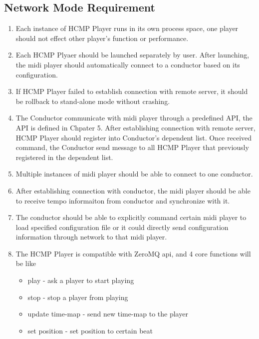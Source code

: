 \subsection{Network Mode Requirement}
\begin{enumerate}
  \item Each instance of HCMP Player runs in its own process space, one player 
        should not effect other player's function or performance. 
        
  \item Each HCMP Plyaer should be launched separately by user. After 
        launching, the midi player should automatically connect to a conductor 
        based on its configuration.

  \item If HCMP Player failed to establish connection with remote server, it should  
        be rollback to stand-alone mode without crashing.
  \item The Conductor communicate with midi player through a predefined API, 
        the API is defined in Chpater 5. After establishing connection with remote   
        server, HCMP Player should register into Conductor's dependent list.   
        Once received command, the Conductor send message to all HCMP Player that    
        previously registered in the dependent list. 

  \item Multiple instances of midi player should be able to connect to one conductor. 
  \item After establishing connection with conductor, the midi player 
        should be able to receive tempo informaiton from conductor and 
        synchronize with it.     
  \item The conductor should be able to explicitly command certain midi player to 
        load specified configuration file or it could directly 
        send configuration information through network to that midi player.
  \item 
    The HCMP Player is compatible with ZeroMQ \cite{zeromq} api, 
    and 4 core functions will be like
    \begin{itemize}
      \item play - ask a player to start playing 
      \item stop - stop a player from playing 
      \item update time-map - send new time-map to the player 
      \item set position - set position to certain beat 
    \end{itemize}
\end{enumerate}

